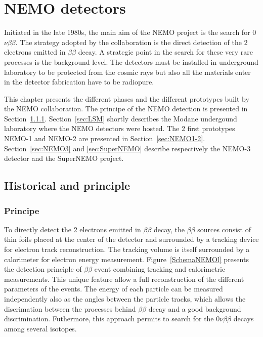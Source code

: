 \documentclass[main.tex]{subfiles}
\begin{document}
\chapter{NEMO detectors}


\NI Initiated in the late 1980s, the main aim of the NEMO project is the search for 0$\nu\beta\beta$. The strategy adopted by the collaboration is the direct detection of the 2 electrons emitted in $\beta\beta$ decay. A strategic point in the search for these very rare processes is the background level. The detectors must be installed in underground laboratory to be protected from the cosmic rays but also all the materials enter in the detector fabrication have to be radiopure.


\bigskip


\NI This chapter presents the different phases and the different prototypes built by the NEMO collaboration. The principe of the NEMO detection is presented in Section~\ref{sec:Principe}. Section~\ref{sec:LSM} shortly describes the Modane undergound laboratory where the NEMO detectors were hosted. The 2 first prototypes NEMO-1 and NEMO-2 are presented in Section~\ref{sec:NEMO1-2}. Section~\ref{sec:NEMO3} and \ref{sec:SuperNEMO} describe respectively the NEMO-3 detector and the SuperNEMO project.


\section{Historical and principle}


\subsection{Principe}\label{sec:Principe}


To directly detect the 2 electrons emitted in $\beta\beta$ decay, the $\beta\beta$ sources consist of thin foils placed at the center of the detector and surrounded by a tracking device for electron track reconstruction. The tracking volume is itself surrounded by a calorimeter for electron energy measurement. Figure~\ref{SchemaNEMOl} presents the detection principle of $\beta\beta$ event combining tracking and calorimetric measurements. This unique feature allow a full reconstruction of the different parameters of the events. The energy of each particle can be measured independently also as the angles between the particle tracks, which allows the discrimation between the processes behind $\beta\beta$ decay and a good background discrimination. Futhermore, this approach permits to search for the 0$\nu\beta\beta$ decays among several isotopes. 
\end{document}

